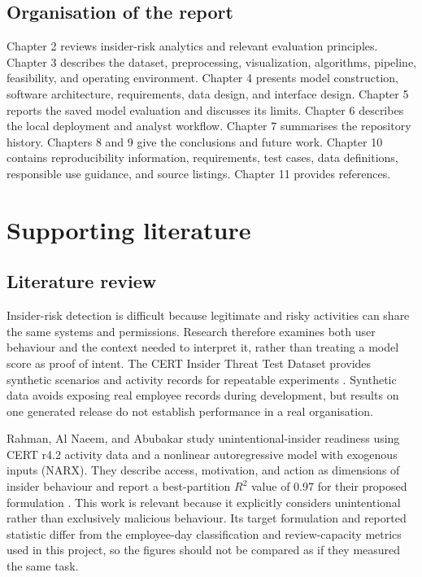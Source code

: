 \section{Organisation of the report}
Chapter 2 reviews insider-risk analytics and relevant evaluation
principles. Chapter 3 describes the dataset, preprocessing,
visualization, algorithms, pipeline, feasibility, and operating
environment. Chapter 4 presents model construction, software
architecture, requirements, data design, and interface design.
Chapter 5 reports the saved model evaluation and discusses its limits.
Chapter 6 describes the local deployment and analyst workflow.
Chapter 7 summarises the repository history. Chapters 8 and 9 give the
conclusions and future work. Chapter 10 contains reproducibility
information, requirements, test cases, data definitions, responsible
use guidance, and source listings. Chapter 11 provides references.

\chapter{Supporting literature}
\label{chap:literature}

\section{Literature review}
Insider-risk detection is difficult because legitimate and risky
activities can share the same systems and permissions. Research
therefore examines both user behaviour and the context needed to
interpret it, rather than treating a model score as proof of intent.
The CERT Insider Threat Test Dataset provides synthetic scenarios and
activity records for repeatable experiments \cite{cert}. Synthetic
data avoids exposing real employee records during development, but
results on one generated release do not establish performance in a
real organisation.

Rahman, Al Naeem, and Abubakar study unintentional-insider readiness
using CERT r4.2 activity data and a nonlinear autoregressive model with
exogenous inputs (NARX). They describe access, motivation, and action
as dimensions of insider behaviour and report a best-partition
\(R^2\) value of 0.97 for their proposed formulation
\cite{rahman2022unintentional}. This work is relevant because it
explicitly considers unintentional rather than exclusively malicious
behaviour. Its target formulation and reported statistic differ from
the employee-day classification and review-capacity metrics used in
this project, so the figures should not be compared as if they measured
the same task.


